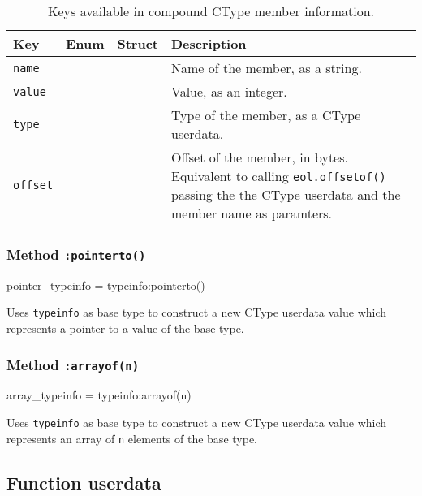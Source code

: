 \begin{table}[ht]
	\centering
	\begin{tabular}{lccp{}}
		\toprule
		Key & Enum & Struct & Description\\
		\midrule
		\texttt{name}  & \Tick & \Tick & Name of the member, as a string. \\
		\texttt{value} & \Tick &       & Value, as an integer. \\
		\texttt{type}  &       & \Tick & Type of the member, as a \textsf{CType} userdata. \\
		\texttt{offset}&       & \Tick & Offset of the member, in bytes.
			Equivalent to calling \texttt{eol.offsetof()} passing the the
			\textsf{CType} userdata and the member name as paramters. \\
		\bottomrule
	\end{tabular}
	\caption{Keys available in compound \textsf{CType} member information.}
	\label{tab:eol-api-ctype-compound-member-fields}
\end{table}


\subsubsection{Method \texttt{:pointerto()}}

\begin{luacode}
pointer_typeinfo = typeinfo:pointerto()
\end{luacode}

Uses \texttt{typeinfo} as base type to construct a new \textsf{CType} userdata
value which represents a pointer to a value of the base type.


\subsubsection{Method \texttt{:arrayof(n)}}

\begin{luacode}
array_typeinfo = typeinfo:arrayof(n)
\end{luacode}

Uses \texttt{typeinfo} as base type to construct a new \textsf{CType} userdata
value which represents an array of \texttt{n} elements of the base type.


\subsection{Function userdata}
	\label{sec:eol-api-function-t}

